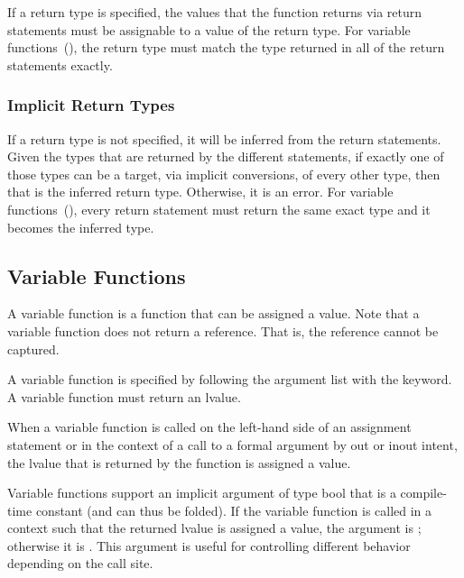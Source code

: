 If a return type is specified, the values that the function returns
via return statements must be assignable to a value of the return
type.  For variable functions~(), the return
type must match the type returned in all of the return statements
exactly.

\subsubsection{Implicit Return Types}
\label{Implicit_Return_Types}

If a return type is not specified, it will be inferred from the return
statements.  Given the types that are returned by the different
statements, if exactly one of those types can be a target, via
implicit conversions, of every other type, then that is the inferred
return type.  Otherwise, it is an error.  For variable
functions~(), every return statement must
return the same exact type and it becomes the inferred type.

\subsection{Variable Functions}
\label{Variable_Functions}

A variable function is a function that can be assigned a value.  Note
that a variable function does not return a reference.  That is, the
reference cannot be captured.

A variable function is specified by following the argument list with
the  keyword.  A variable function must return an lvalue.

When a variable function is called on the left-hand side of an
assignment statement or in the context of a call to a formal argument
by out or inout intent, the lvalue that is returned by the function is
assigned a value.

Variable functions support an implicit argument  of type
bool that is a compile-time constant (and can thus be folded).  If the
variable function is called in a context such that the returned lvalue
is assigned a value, the argument  is ;
otherwise it is .  This argument is useful for controlling
different behavior depending on the call site.

